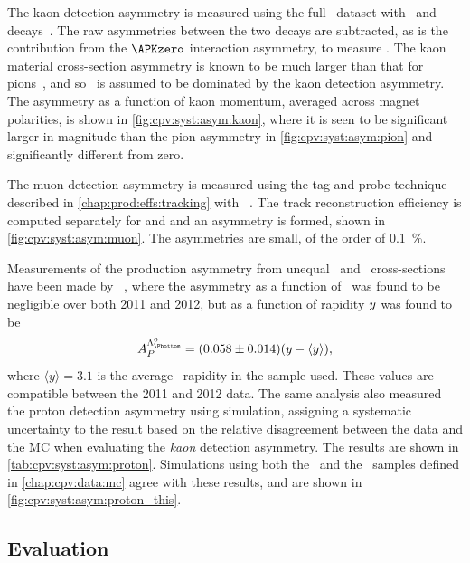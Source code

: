 The kaon detection asymmetry is measured using the full \runone\ dataset with
\DpToKpipi\ and \decay{\PDplus}{\APKzero\Ppiplus} decays~\cite{Aaij:2014gsa}.
The raw asymmetries between the two decays are subtracted, as is the
contribution from the $\APKzero$ interaction asymmetry, to measure \ADKpi.
The kaon material cross-section asymmetry is known to be much larger than that
for pions~\cite{PDG2014}, and so \ADKpi\ is assumed to be dominated by the kaon
detection asymmetry.
The asymmetry as a function of kaon momentum, averaged across magnet
polarities, is shown in \cref{fig:cpv:syst:asym:kaon}, where it is seen to be
significant larger in magnitude than the pion asymmetry in
\cref{fig:cpv:syst:asym:pion} and significantly different from zero.

The muon detection asymmetry is measured using the tag-and-probe technique described in \cref{chap:prod:effs:tracking} with \JpsiTomumu~\cite{Stahl:2010261}.
The track reconstruction efficiency is computed separately for \Pmuon and
\APmuon and an asymmetry is formed, shown in \cref{fig:cpv:syst:asym:muon}.
The asymmetries are small, of the order of \SI{0.1}{\percent}.

Measurements of the production asymmetry from unequal \PLambdab\ and
\APLambdab\ cross-sections have been made by \lhcb~\cite{Aaij:2015fea}, where
the asymmetry as a function of \pT\ was found to be negligible over both 2011
and 2012, but as a function of rapidity $y$ was found to be
\begin{equation}
  \APLb = (0.058 \pm 0.014)(y - \langle{y}\rangle),
\end{equation}
where $\langle{y}\rangle = 3.1$ is the average \PLambdab\ rapidity in the
sample used.
These values are compatible between the 2011 and 2012 data.
The same analysis also measured the proton detection asymmetry using
simulation, assigning a systematic uncertainty to the result based on the
relative disagreement between the data and the \ac{MC} when evaluating the
\emph{kaon} detection asymmetry.
The results are shown in \cref{tab:cpv:syst:asym:proton}.
Simulations using both the \pKK\ and the \ppipi\ samples defined in
\cref{chap:cpv:data:mc} agree with these results, and are shown in
\cref{fig:cpv:syst:asym:proton_this}.

\subsection{Evaluation}
\label{chap:cpv:syst:asym:eval}

